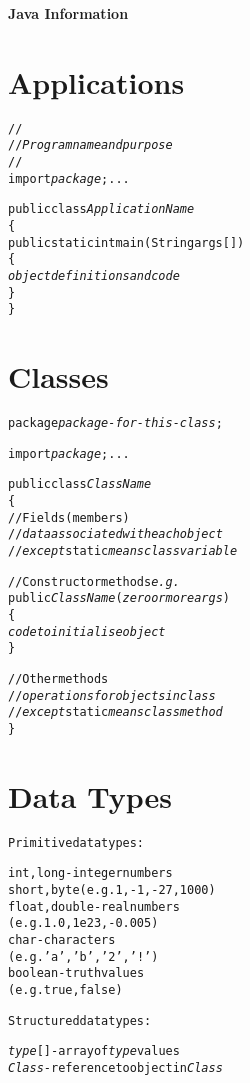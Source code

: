 \documentclass[twocolumn,12pt]{article}
\begin{document}
\noindent

\noindent
\textbf{\huge Java Information}

\section*{Applications}
\begin{alltt}
//
// \emph{Program name and purpose}
//
import \emph{package}; ...

public class \emph{ApplicationName}
\{
   public static int main(String args[])
   \{
      \emph{object definitions and code}
   \}
\}
\end{alltt}
\section*{Classes}
\begin{alltt}
package \emph{package-for-this-class};

import \emph{package}; ...

public class \emph{ClassName}
\{
   // Fields (members)
   // \emph{data associated with each object} 
   // \emph{except} static \emph{means class variable}

   // Constructor methods \emph{e.g.}
   public \emph{ClassName}(\emph{zero or more args})
   \{
      \emph{code to initialise object}
   \}

   // Other methods
   // \emph{operations for objects in class}
   // \emph{except} static \emph{means class method}
\}
\end{alltt}
\section*{Data Types}
\begin{alltt}
\textrm{Primitive data types:}

int, long     - \textrm{integer numbers}
short, byte     (\textrm{e.g.} 1, -1, -27, 1000)
float, double - \textrm{real numbers}
                (e.g. 1.0, 1e23, -0.005)
char          - \textrm{characters}
                (\textrm{e.g.} 'a', 'b', '2', '!')
boolean       - \textrm{truth values}
                (\textrm{e.g.} true, false)

\textrm{Structured data types:}

\emph{type}[]      - \textrm{array of} \emph{type} \textrm{values}
\emph{Class}       - \textrm{reference to object in} \emph{Class}
\end{alltt}
\end{document}
